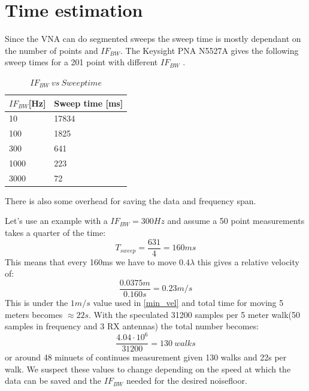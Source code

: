 \section{Time estimation}
\label{TIME_EST}
Since the \gls{VNA} can do segmented sweeps the sweep time is mostly dependant on the number of points and $IF_{BW}$.
The Keysight PNA N5527A gives the following sweep times for a 201 point with different $IF_{BW}$ \citep{Key_PNA}. \\

\begin{table}[H]
\centering
\label{my-label}
\begin{tabular}{|l|l|}
\hline
$IF_{BW}${[}Hz{]} & Sweep time {[}ms{]} \\
\hline
10              & 17834               \\
100             & 1825                \\
300             & 641                 \\
1000            & 223                 \\
3000            & 72            \\
\hline 
\end{tabular}
\caption{$IF_{BW} \ vs \ Sweep time$}
\end{table}

There is also some overhead for saving the data and frequency span.


Let's use an example with a $IF_{BW} = 300Hz$ and assume a 50 point measurements takes a quarter of the time:
\begin{equation}
T_{sweep} = \frac{631}{4} = 160ms
\end{equation}
This means that every 160ms we have to move $0.4 \lambda$ this gives a relative velocity of:
\begin{equation}
\frac{0.0375m}{0.160s} = 0.23 m/s
\end{equation}
This is under the $1m/s$ value used in \autoref{min_vel}
and total time for moving 5 meters becomes $\approx 22s$.
With the speculated 31200 samples per 5 meter walk(50 samples in frequency and 3 RX antennas) the total number becomes:
\begin{equation}
\frac{4.04 \cdot 10^6}{31200} = 130 \ walks
\end{equation}
or around 48 minuets of continues measurement given 130 walks and 22s per walk. We suspect these values to change depending on the speed at which the data can be saved and the $IF_{BW}$ needed for the desired noisefloor.
